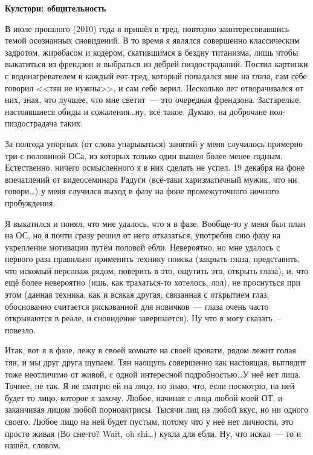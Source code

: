 \documentclass[a4paper,14pt,oneside]{memoir}
\begin{document}
\begin{shaded}

\begin{center}
\Large\textbf{Кулстори: общительность}
\end{center}


\bigskip

В июле прошлого (2010) года я пришёл в тред, повторно заинтересовавшись темой осознанных сновидений. В то время я являлся совершенно классическим задротом, жиробасом и кодером, скатившимся в бездну титанизма, лишь чтобы выкатиться из френдзон и выбраться из дебрей пиздостраданий. Постил картинки с водонагревателем в каждый еот-тред, который попадался мне на глаза, сам себе говорил <<тян не нужны>>, и сам себе верил. Несколько лет отворачивался от них, зная, что лучшее, что мне светит~--- это очередная френдзона. Застарелые, настоявшиеся обиды и сожаления\ldots ну, всё такое. Думаю, на доброчане пол-пиздострадача таких.

За полгода упорных (от слова упарываться) занятий у меня случилось примерно три с половиной ОСа, из которых только один вышел более-менее годным. Естественно, ничего осмысленного я в них сделать не успел. 19 декабря на фоне впечатлений от видеосеминара Радуги (всё-таки харизматичный мужик, что ни говори\ldots) у меня случился выход в фазу на фоне промежуточного ночного пробуждения.

Я выкатился и понял, что мне удалось, что я в фазе. Вообще-то у меня был план на ОС, но я почти сразу решил от него отказаться, употребив сию фазу на укрепление мотивации путём половой ебли. Невероятно, но мне удалось с первого раза правильно применить технику поиска (закрыть глаза, представить, что искомый персонаж рядом, поверить в это, ощутить это, открыть глаза), и, что ещё более невероятно (ишь, как трахаться-то хотелось, лол), не проснуться при этом (данная техника, как и всякая другая, связанная с открытием глаз, обоснованно считается рискованной для новичков~--- глаза очень часто открываются в реале, и сновидение завершается). Ну что я могу сказать~-- повезло.

Итак, вот я в фазе, лежу в своей комнате на своей кровати, рядом лежит голая тян, и мы друг друга щупаем. Тян наощупь совершенно как настоящая, выглядит тоже неотличимо от живой, с одной интересной подробностью\ldots У неё нет лица. Точнее, не так. Я не смотрю ей на лицо, но знаю, что, если посмотрю, на ней будет то лицо, которое я захочу. Любое, начиная с лица любой моей ОТ, и заканчивая лицом любой порноактрисы. Тысячи лиц на любой вкус, но ни одного своего. Любое лицо на ней будет пустым, потому что у неё нет личности, это просто живая (Во сне-то? Wait, oh shi\ldots) кукла для ебли. Ну, что искал~--- то и нашёл, словом.


\end{shaded}
\end{document}
